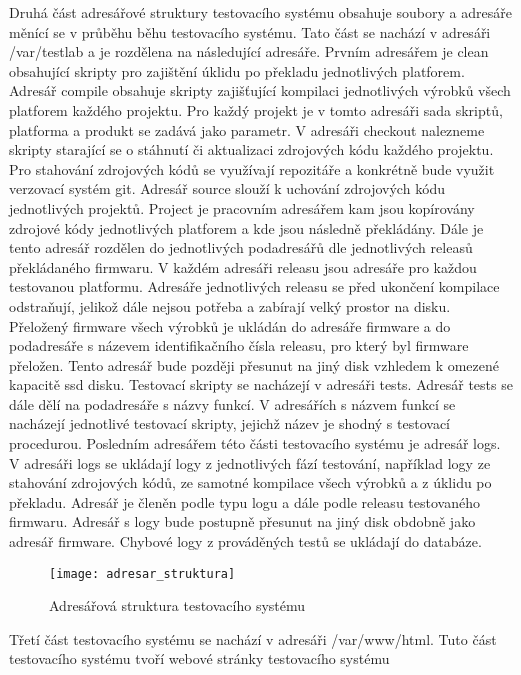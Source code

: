 Druhá část adresářové struktury testovacího systému obsahuje soubory a adresáře měnící se v průběhu běhu testovacího systému. Tato část se nachází v adresáři /var/testlab a je rozdělena na následující adresáře. Prvním adresářem je clean obsahující skripty pro zajištění úklidu po překladu jednotlivých platforem. Adresář compile obsahuje skripty zajišťující kompilaci jednotlivých výrobků všech platforem každého projektu. Pro každý projekt je v tomto adresáři sada skriptů, platforma a produkt se zadává jako parametr. V adresáři checkout nalezneme skripty starající se o stáhnutí či aktualizaci zdrojových kódu každého projektu. Pro stahování zdrojových kódů se využívají repozitáře a konkrétně bude využit verzovací systém git. Adresář source slouží k uchování zdrojových kódu jednotlivých projektů. Project je pracovním adresářem kam jsou kopírovány zdrojové kódy jednotlivých platforem a kde jsou následně překládány. Dále je tento adresář rozdělen do jednotlivých podadresářů dle jednotlivých releasů překládaného firmwaru. V každém adresáři releasu jsou adresáře pro každou testovanou platformu. Adresáře jednotlivých releasu se před ukončení kompilace odstraňují, jelikož dále nejsou potřeba a zabírají velký prostor na disku. Přeložený firmware všech výrobků je ukládán do adresáře firmware a do podadresáře s názevem identifikačního čísla releasu, pro který byl firmware přeložen. Tento adresář bude později přesunut na jiný disk vzhledem k omezené kapacitě ssd disku. Testovací skripty se nacházejí v adresáři tests. Adresář tests se dále dělí na podadresáře s názvy funkcí. V adresářích s názvem funkcí se nacházejí jednotlivé testovací skripty, jejichž název je shodný s testovací procedurou. Posledním adresářem této části testovacího systému je adresář logs. V adresáři logs se ukládají logy z jednotlivých fází testování, například logy ze stahování zdrojových kódů, ze samotné kompilace všech výrobků a z úklidu po překladu. Adresář je členěn podle typu logu a dále podle releasu testovaného firmwaru. Adresář s logy bude postupně přesunut na jiný disk obdobně jako adresář firmware. Chybové logy z prováděných testů se ukládají do databáze.

\begin{figure}[h]
  \centering
  \texttt{[image: adresar\_struktura]}
  \caption{Adresářová struktura testovacího systému}
  \label{fig:adresar_struktura}
\end{figure}

Třetí část testovacího systému se nachází v adresáři /var/www/html. Tuto část testovacího systému tvoří webové stránky testovacího systému

